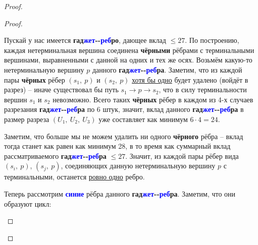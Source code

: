 \documentclass[a4paper,12pt]{article}
\begin{document}
\begin{proof}
\begin{proof}
\begin{itemize}
            Пускай у нас имеется \textbf{гад}\textbf{\textcolor{blue}{жет}}\textbf{-}\textbf{-}\textbf{\textcolor{blue}{реб}}\textbf{ро}, дающее вклад $\leqslant 27$. По построению, каждая нетерминальная вершина соединена \textbf{чёрными} рёбрами с терминальными вершинами, выравненными с данной на одних и тех же осях. Возьмём какую-то нетерминальную вершину $p$ данного \textbf{гад}\textbf{\textcolor{blue}{жет}}\textbf{-}\textbf{-}\textbf{\textcolor{blue}{реб}}\textbf{ра}. Заметим, что из каждой пары \textbf{чёрных} рёбер $(s_1,\ p)$ и $(s_2,\ p)$ \underline{хотя бы одно} будет удалено (войдёт в разрез)  -- иначе существовал бы путь $s_1\to p \to s_2$, что в силу терминальности вершин $s_1$ и $s_2$ невозможно. Всего таких \textbf{чёрных} рёбер в каждом из 4-х случаев разрезания \textbf{гад}\textbf{\textcolor{blue}{жет}}\textbf{-}\textbf{-}\textbf{\textcolor{blue}{реб}}\textbf{ра} по 6 штук, значит, вклад данного \textbf{гад}\textbf{\textcolor{blue}{жет}}\textbf{-}\textbf{-}\textbf{\textcolor{blue}{реб}}\textbf{ра} в размер разреза $(U_1,\ U_2,\ U_3)$ уже составляет как минимум $6 \cdot 4 = 24$.
            
            Заметим, что больше мы не можем удалить ни одного \textbf{чёрного} рёбра -- вклад тогда станет как равен как минимум 28, в то время как суммарный вклад рассматриваемого \textbf{гад}\textbf{\textcolor{blue}{жет}}\textbf{-}\textbf{-}\textbf{\textcolor{blue}{реб}}\textbf{ра} $\leqslant 27$. Значит, из каждой пары рёбер вида $(s_i,\ p)$, $(s_j,\ p)$, соединяющих данную нетерминальную вершину $p$ с терминальными, останется \underline{ровно одно} ребро.
            
            Теперь рассмотрим \textbf{\textcolor{blue}{синие}} рёбра данного \textbf{гад}\textbf{\textcolor{blue}{жет}}\textbf{-}\textbf{-}\textbf{\textcolor{blue}{реб}}\textbf{ра}. Заметим, что они образуют цикл:
            
            \begin{center}
\end{center}
\end{itemize}
\end{proof}
\end{proof}
\end{document}
